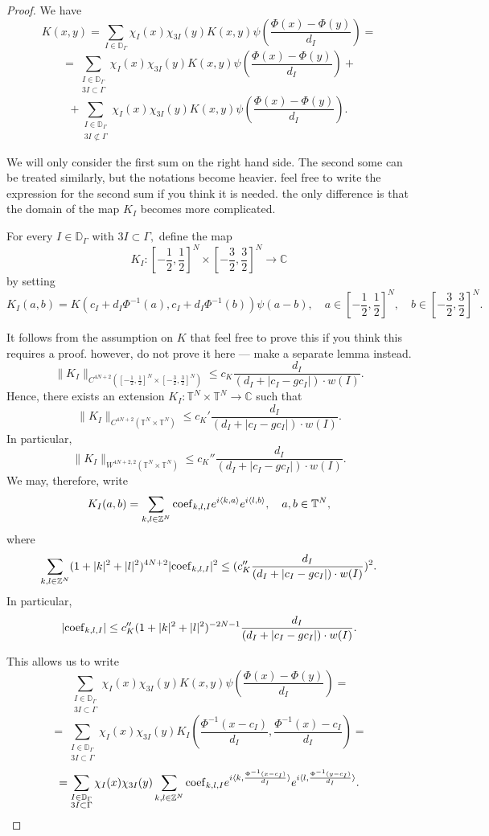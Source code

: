\documentclass{amsart}
\numberwithin{equation}{section}
\begin{document}
\begin{proof} We have
$$K(x,y)=\sum_{I\in\mathbb{D}_{\Gamma}}\chi_I(x)\chi_{3I}(y)K(x,y)\psi(\frac{\Phi(x)-\Phi(y)}{d_I})=$$
$$=\sum_{\substack{I\in\mathbb{D}_{\Gamma}\\ 3I\subset\Gamma}}\chi_I(x)\chi_{3I}(y)K(x,y)\psi(\frac{\Phi(x)-\Phi(y)}{d_I})+$$
$$+\sum_{\substack{I\in\mathbb{D}_{\Gamma}\\ 3I\not\subset\Gamma}}\chi_I(x)\chi_{3I}(y)K(x,y)\psi(\frac{\Phi(x)-\Phi(y)}{d_I}).$$

We will only consider the first sum on the right hand side. The second some can be treated similarly, but the notations become heavier. {\color{red} feel free to write the expression for the second sum if you think it is needed. the only difference is that the domain of the map $K_I$ becomes more complicated.}

For every $I\in\mathbb{D}_{\Gamma}$ with $3I\subset\Gamma,$ define the map
$$K_I:[-\frac12,\frac12]^N\times[-\frac32,\frac32]^N\to\mathbb{C}$$
by setting
$$K_I(a,b)=K(c_I+d_I\Phi^{-1}(a),c_I+d_I\Phi^{-1}(b))\psi(a-b),\quad a\in[-\frac12,\frac12]^N,\quad b\in[-\frac32,\frac32]^N.$$

It follows from the assumption on $K$ that {\color{red} feel free to prove this if you think this requires a proof. however, do not prove it here --- make a separate lemma instead.}
$$\|K_I\|_{C^{4N+2}([-\frac12,\frac12]^N\times[-\frac32,\frac32]^N)}\leq c_K\frac{d_I}{(d_I+|c_I-gc_I|)\cdot w(I)}.$$
Hence, there exists an extension $K_I:\mathbb{T}^N\times\mathbb{T}^N\to\mathbb{C}$ such that
$$\|K_I\|_{C^{4N+2}(\mathbb{T}^N\times\mathbb{T}^N)}\leq c_K'\frac{d_I}{(d_I+|c_I-gc_I|)\cdot w(I)}.$$
In particular,
$$\|K_I\|_{W^{4N+2,2}(\mathbb{T}^N\times\mathbb{T}^N)}\leq c_K''\frac{d_I}{(d_I+|c_I-gc_I|)\cdot w(I)}.$$
We may, therefore, write
$$K_I(a,b)=\sum_{k,l\in\mathbb{Z}^N}{\rm coef}_{k,l,I}e^{i\langle k,a\rangle}e^{i\langle l,b\rangle},\quad a,b\in\mathbb{T}^N,$$
where
$$\sum_{k,l\in\mathbb{Z}^N}(1+|k|^2+|l|^2)^{4N+2}|{\rm coef}_{k,l,I}|^2\leq (c_K''\frac{d_I}{(d_I+|c_I-gc_I|)\cdot w(I)})^2.$$
In particular,
$$|{\rm coef}_{k,l,I}|\leq c_K''(1+|k|^2+|l|^2)^{-2N-1}\frac{d_I}{(d_I+|c_I-gc_I|)\cdot w(I)}.$$

This allows us to write
$$\sum_{\substack{I\in\mathbb{D}_{\Gamma}\\ 3I\subset\Gamma}}\chi_I(x)\chi_{3I}(y)K(x,y)\psi(\frac{\Phi(x)-\Phi(y)}{d_I})=$$
$$=\sum_{\substack{I\in\mathbb{D}_{\Gamma}\\ 3I\subset\Gamma}}\chi_I(x)\chi_{3I}(y)K_I(\frac{\Phi^{-1}(x-c_I)}{d_I},\frac{\Phi^{-1}(x)-c_I}{d_I})=$$
$$=\sum_{\substack{I\in\mathbb{D}_{\Gamma}\\ 3I\subset\Gamma}}\chi_I(x)\chi_{3I}(y)\sum_{k,l\in\mathbb{Z}^N}{\rm coef}_{k,l,I}e^{i\langle k,\frac{\Phi^{-1}(x-c_I)}{d_I}\rangle}e^{i\langle l,\frac{\Phi^{-1}(y-c_I)}{d_I}\rangle}.$$
%


\end{proof}
\end{document}
